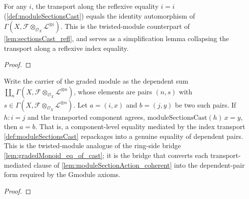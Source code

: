 \begin{lemma}\leanok
  \label{lem:moduleSectionsCast_refl}
  For any \(i\), the transport along the reflexive equality \(i = i\)
  (\cref{def:moduleSectionsCast}) equals the identity automorphism of
  \(\Gamma(X, \mathcal{F} \otimes_{\mathcal{O}_X} \mathcal{L}^{\otimes i})\). This is
  the twisted-module counterpart of \cref{lem:sectionsCast_refl}, and serves as a
  simplification lemma collapsing the transport along a reflexive index equality.
\end{lemma}

\begin{proof}\leanok
\end{proof}

\begin{lemma}\leanok
  \label{lem:moduleGradedMonoid_eq_of_cast}
  Write the carrier of the graded module as the dependent sum
  \(\coprod_{n} \Gamma(X, \mathcal{F} \otimes_{\mathcal{O}_X} \mathcal{L}^{\otimes n})\),
  whose elements are pairs \((n, s)\) with
  \(s \in \Gamma(X, \mathcal{F} \otimes_{\mathcal{O}_X} \mathcal{L}^{\otimes n})\). Let
  \(a = (i, x)\) and \(b = (j, y)\) be two such pairs. If \(h : i = j\) and the
  transported component agrees, \(\mathrm{moduleSectionsCast}(h)\,x = y\), then
  \(a = b\). That is, a component-level equality mediated by the index transport
  \cref{def:moduleSectionsCast} repackages into a genuine equality of dependent
  pairs. This is the twisted-module analogue of the ring-side bridge
  \cref{lem:gradedMonoid_eq_of_cast}; it is the bridge that converts each
  transport-mediated clause of \cref{lem:moduleSectionAction_coherent} into the
  dependent-pair form required by the \(\mathrm{Gmodule}\) axioms.
\end{lemma}

\begin{proof}

\leanok
\end{proof}

